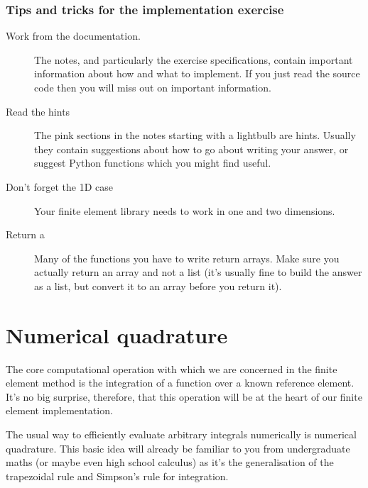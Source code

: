 \documentclass{book}
\begin{document}
\subsection{Tips and tricks for the implementation exercise}
\label{\detokenize{index:tips-and-tricks-for-the-implementation-exercise}}\begin{description}
\item[{Work from the documentation.}] \leavevmode
The notes, and particularly the exercise specifications, contain
important information about how and what to implement. If you just
read the source code then you will miss out on important
information.

\item[{Read the hints}] \leavevmode
The pink sections in the notes starting with a lightbulb are
hints. Usually they contain suggestions about how to go about
writing your answer, or suggest Python functions which you might
find useful.

\item[{Don’t forget the 1D case}] \leavevmode
Your finite element library needs to work in one and two dimensions.

\item[{Return a }] \leavevmode
Many of the functions you have to write return arrays. Make sure
you actually return an array and not a list (it’s usually fine to
build the answer as a list, but convert it to an array before you
return it).

\end{description}

\mainmatter


\chapter{Numerical quadrature}
\label{\detokenize{1_quadrature::doc}}\label{\detokenize{1_quadrature:numerical-quadrature}}
The core computational operation with which we are concerned in the
finite element method is the integration of a function over a known
reference element. It’s no big surprise, therefore, that this
operation will be at the heart of our finite element implementation.

The usual way to efficiently evaluate arbitrary integrals numerically
is numerical quadrature. This basic idea will already be familiar to
you from undergraduate maths (or maybe even high school calculus) as
it’s the generalisation of the trapezoidal rule and Simpson’s rule for
integration.
\end{document}
